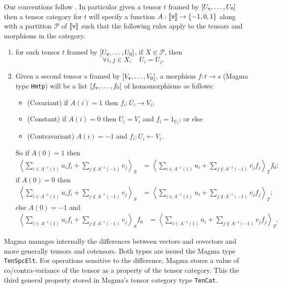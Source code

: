 Our conventions follow .  In particular given
a tensor $t$ framed by $[U_{\operatorname{\mathtt{v}}},\dots,U_0]$ then a tensor category for
$t$ will specify a function $A:\llbracket \operatorname{\mathtt{v}}\rrbracket\to \{-1,0,1\}$ along with
a partition $\mathcal{P}$ of $\llbracket \operatorname{\mathtt{v}}\rrbracket$ such that the following 
rules apply to the tensors and morphisms in the category.
\begin{enumerate}
\item for each tensor $t$ framed by $[U_{\operatorname{\mathtt{v}}},\dots,U_0]$, if
$X\in\mathcal{P}$, then 
$$\forall i,j\in X,\quad U_i=U_j.$$

\item Given a second tensor $s$ framed by $[V_{\operatorname{\mathtt{v}}},\dots,V_0]$,
a morphism $f:t\to s$ (Magma type {\tt Hmtp}) will be a list
$[f_{\operatorname{\mathtt{v}}},\dots,f_0]$ of homomorphisms as follows:
\begin{itemize}
\item (Covariant) if $A(i)=1$ then $f_i:U_i\to V_i$;
\item (Constant) if $A(i)=0$ then $U_i=V_i$ and $f_i=1_{U_i}$; or else
\item (Contravariant) $A(i)=-1$ and $f_i:U_i\leftarrow V_i$.
\end{itemize}
So if $A(0)=1$ then
\begin{align*}
	\left\langle \sum_{i\in A^{-1}(1)} u_i f_i
		+\sum_{j\not\in A^{-1}(-1)} v_j\right\rangle_S
		& = \left\langle  \sum_{i\in A^{-1}(1)} u_i 
		+\sum_{j\not\in A^{-1}(-1)} v_j f_j\right\rangle_T f_0;
\end{align*}
if $A(0)=0$ then
\begin{align*}
	\left\langle \sum_{i\in A^{-1}(1)} u_i f_i
		+\sum_{j\not\in A^{-1}(-1)} v_j\right\rangle_S
		& = \left\langle  \sum_{i\in A^{-1}(1)} u_i 
		+\sum_{j\not\in A^{-1}(-1)} v_j f_j\right\rangle_T;
\end{align*}
else $A(0)=-1$ and 
\begin{align*}
	\left\langle \sum_{i\in A^{-1}(1)} u_i f_i
		+\sum_{j\not\in A^{-1}(-1)} v_j\right\rangle_S f_0
		& = \left\langle  \sum_{i\in A^{-1}(1)} u_i 
		+\sum_{j\not\in A^{-1}(-1)} v_j f_j\right\rangle_T.
\end{align*}
\end{enumerate}

Magma manages internally the differences between 
vectors and covectors and more generally tensors and cotensors.
Both types are issued the Magma type {\tt TenSpcElt}.
For operations sensitive to the difference, Magma stores a value of
co/contra-variance of the tensor as a property of the tensor category.
This the third general property stored in Magma's tensor category type
{\tt TenCat}.

